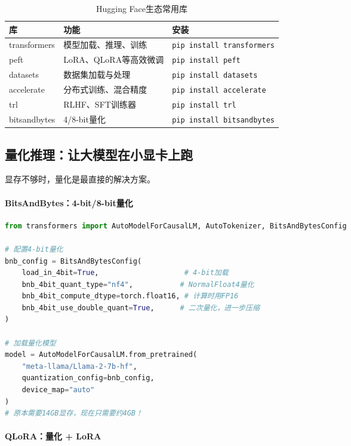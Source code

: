 \begin{table}[htbp]
\centering
\small
\renewcommand{\arraystretch}{1.3}
\begin{tabular}{l|l|l}
\toprule
\textbf{库} & \textbf{功能} & \textbf{安装} \\
\midrule
transformers & 模型加载、推理、训练 & \texttt{pip install transformers} \\
peft & LoRA、QLoRA等高效微调 & \texttt{pip install peft} \\
datasets & 数据集加载与处理 & \texttt{pip install datasets} \\
accelerate & 分布式训练、混合精度 & \texttt{pip install accelerate} \\
trl & RLHF、SFT训练器 & \texttt{pip install trl} \\
bitsandbytes & 4/8-bit量化 & \texttt{pip install bitsandbytes} \\
\bottomrule
\end{tabular}
\caption{Hugging Face生态常用库}
\end{table}

\subsection*{量化推理：让大模型在小显卡上跑}

显存不够时，量化是最直接的解决方案。

\paragraph{BitsAndBytes：4-bit/8-bit量化}\mbox{}\par\nopagebreak

\begin{lstlisting}[language=Python, caption=4-bit量化加载模型]
from transformers import AutoModelForCausalLM, AutoTokenizer, BitsAndBytesConfig

# 配置4-bit量化
bnb_config = BitsAndBytesConfig(
    load_in_4bit=True,                    # 4-bit加载
    bnb_4bit_quant_type="nf4",           # NormalFloat4量化
    bnb_4bit_compute_dtype=torch.float16, # 计算时用FP16
    bnb_4bit_use_double_quant=True,      # 二次量化，进一步压缩
)

# 加载量化模型
model = AutoModelForCausalLM.from_pretrained(
    "meta-llama/Llama-2-7b-hf",
    quantization_config=bnb_config,
    device_map="auto"
)
# 原本需要14GB显存，现在只需要约4GB！
\end{lstlisting}

\paragraph{QLoRA：量化 + LoRA}

